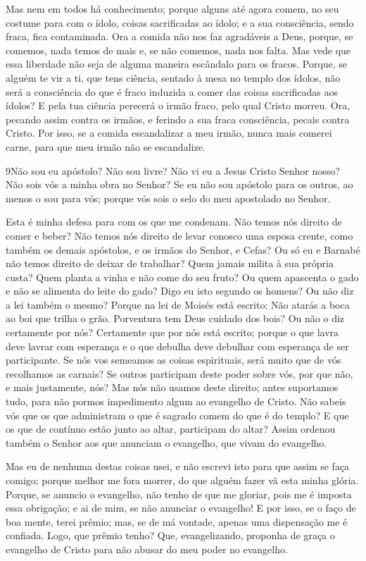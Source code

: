 Mas nem em todos há conhecimento; porque alguns até agora comem,
no seu costume para com o ídolo, coisas sacrificadas ao ídolo; e a
sua consciência, sendo fraca, fica contaminada. Ora a comida não
nos faz agradáveis a Deus, porque, se comemos, nada temos de mais e,
se não comemos, nada nos falta. Mas vede que essa liberdade não
seja de alguma maneira escândalo para os fracos. Porque, se
alguém te vir a ti, que tens ciência, sentado à mesa no templo dos
ídolos, não será a consciência do que é fraco induzida a comer das
coisas sacrificadas aos ídolos? E pela tua ciência perecerá o
irmão fraco, pelo qual Cristo morreu. Ora, pecando assim
contra os irmãos, e ferindo a sua fraca consciência, pecais contra
Cristo. Por isso, se a comida escandalizar a meu irmão, nunca
mais comerei carne, para que meu irmão não se escandalize.

\medskip

\lettrine{9} Não sou eu apóstolo? Não sou livre? Não vi eu a
Jesus Cristo Senhor nosso? Não sois vós a minha obra no Senhor?
Se eu não sou apóstolo para os outros, ao menos o sou para vós;
porque vós sois o selo do meu apostolado no Senhor.

Esta é minha defesa para com os que me condenam. Não temos nós
direito de comer e beber? Não temos nós direito de levar conosco
uma esposa crente, como também os demais apóstolos, e os irmãos do
Senhor, e Cefas? Ou só eu e Barnabé não temos direito de deixar
de trabalhar? Quem jamais milita à sua própria custa? Quem
planta a vinha e não come do seu fruto? Ou quem apascenta o gado e
não se alimenta do leite do gado? Digo eu isto segundo os
homens? Ou não diz a lei também o mesmo? Porque na lei de Moisés
está escrito: Não atarás a boca ao boi que trilha o grão. Porventura
tem Deus cuidado dos bois? Ou não o diz certamente por nós?
Certamente que por nós está escrito; porque o que lavra deve lavrar
com esperança e o que debulha deve debulhar com esperança de ser
participante. Se nós vos semeamos as coisas espirituais, será
muito que de vós recolhamos as carnais? Se outros participam
deste poder sobre vós, por que não, e mais justamente, nós? Mas nós
não usamos deste direito; antes suportamos tudo, para não pormos
impedimento algum ao evangelho de Cristo. Não sabeis vós que
os que administram o que é sagrado comem do que é do templo? E que
os que de contínuo estão junto ao altar, participam do altar?
Assim ordenou também o Senhor aos que anunciam o evangelho,
que vivam do evangelho.

Mas eu de nenhuma destas coisas usei, e não escrevi isto para que
assim se faça comigo; porque melhor me fora morrer, do que alguém
fazer vã esta minha glória. Porque, se anuncio o evangelho,
não tenho de que me gloriar, pois me é imposta essa obrigação; e ai
de mim, se não anunciar o evangelho! E por isso, se o faço de
boa mente, terei prêmio; mas, se de má vontade, apenas uma
dispensação me é confiada. Logo, que prêmio tenho? Que,
evangelizando, proponha de graça o evangelho de Cristo para não
abusar do meu poder no evangelho.

